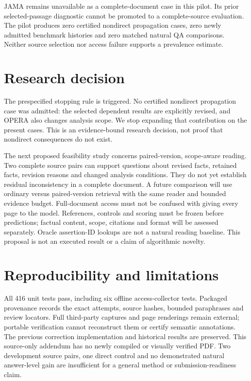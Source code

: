 \documentclass[11pt]{article}
\begin{document}
JAMA remains unavailable as a complete-document case in this pilot. Its prior
selected-passage diagnostic cannot be promoted to a complete-source evaluation.
The pilot produces zero certified nondirect propagation cases, zero newly
admitted benchmark histories and zero matched natural QA comparisons. Neither
source selection nor access failure supports a prevalence estimate.

\section{Research decision}\label{sec:v12decision}
The prespecified stopping rule is triggered. No certified nondirect propagation
case was admitted: the selected dependent results are explicitly revised, and
OPERA also changes analysis scope. We stop expanding that contribution on the
present cases. This is an evidence-bound
research decision, not proof that nondirect consequences do not exist.

The next proposed feasibility study concerns paired-version, scope-aware
reading. Two complete source pairs can support questions about revised facts,
retained facts, revision reasons and changed analysis conditions. They do not
yet establish residual inconsistency in a complete document. A future comparison
will use ordinary versus paired-version retrieval with the same reader and
bounded evidence budget. Full-document access must not be confused with giving
every page to the model. References, controls and scoring must be frozen before
predictions; factual content, scope, citations and format will be assessed
separately. Oracle assertion-ID lookups are not a natural reading baseline.
This proposal is not an executed result or a claim of algorithmic novelty.

\section{Reproducibility and limitations}\label{sec:v12repro}
All 416 unit tests pass, including six offline access-collector tests. Packaged
provenance records the exact attempts, source hashes, bounded paraphrases and
review locators. Full third-party captures and page renderings remain external;
portable verification cannot reconstruct them or certify semantic annotations.
The previous correction implementation and historical results are preserved.
This source-only addendum has no newly compiled or visually verified PDF.
Two development source pairs, one direct control and no demonstrated natural
answer-level gain are insufficient for a general method or submission-readiness
claim.
\end{document}
